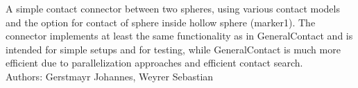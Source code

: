 \ei

%
\newpage


\label{sec:item:ObjectContactSphereSphere}
A simple contact connector between two spheres, using various contact models and the option for contact of sphere inside hollow sphere (marker1). The connector implements at least the same functionality as in GeneralContact and is intended for simple setups and for testing, while GeneralContact is much more efficient due to parallelization approaches and efficient contact search.
\vspace{12pt}\\

\noindent Authors: Gerstmayr Johannes, Weyrer Sebastian
\vspace{12pt}\\

